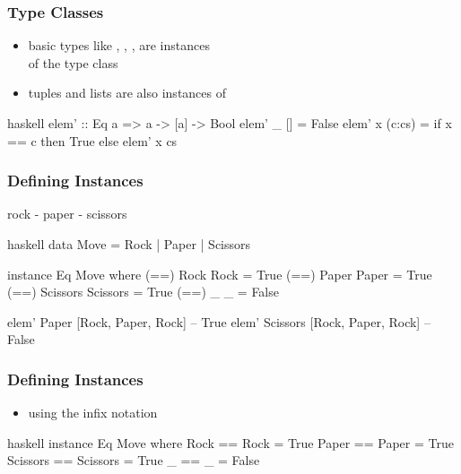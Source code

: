 \documentclass[dvipsnames]{beamer}
\theoremstyle{plain}
\begin{document}
\begin{frame}[fragile]
  \frametitle{Type Classes}

  \begin{itemize}
    \item basic types like , ,
      ,  are instances\\
      of the type class 
    \item tuples and lists are also instances of 
  \end{itemize}

  \pause
  \begin{exampleblock}{}
    \begin{pygments}{haskell}
elem' :: Eq a => a -> [a] -> Bool
elem' _ []     = False
elem' x (c:cs) = if x == c then True else elem' x cs
    \end{pygments}
  \end{exampleblock}
\end{frame}

\begin{frame}[fragile]
  \frametitle{Defining Instances}

  \begin{exampleblock}{rock - paper - scissors}
    \begin{pygments}{haskell}
data Move = Rock | Paper | Scissors

instance Eq Move where
  (==) Rock     Rock     = True
  (==) Paper    Paper    = True
  (==) Scissors Scissors = True
  (==) _        _        = False

elem' Paper [Rock, Paper, Rock]    -- True
elem' Scissors [Rock, Paper, Rock] -- False
    \end{pygments}
  \end{exampleblock}
\end{frame}

\begin{frame}[fragile]
  \frametitle{Defining Instances}

  \begin{itemize}
    \item using the infix notation
  \end{itemize}

  \begin{exampleblock}{}
    \begin{pygments}{haskell}
instance Eq Move where
  Rock     == Rock     = True
  Paper    == Paper    = True
  Scissors == Scissors = True
  _        == _        = False
    \end{pygments}
  \end{exampleblock}
\end{frame}
\end{document}
